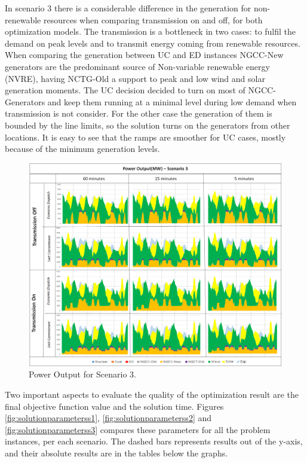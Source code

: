 \documentclass[12pt,LUDisStyle,twosided]{book}
\begin{document}
In scenario 3 there is a considerable difference in the generation for non-renewable resources when comparing transmission on and off, for both optimization models. The transmission is a bottleneck in two cases: to fulfil the demand on peak levels and to transmit energy coming from renewable resources. When comparing the generation between UC and ED instances NGCC-New generators are the predominant source of Non-variable renewable energy (NVRE), having NCTG-Old a support to peak and low wind and solar generation moments. The UC decision decided to turn on most of NGCC-Generators and keep them running at a minimal level during low demand when transmission is not consider. For the other case the generation of them is bounded by the line limits, so the solution turns on the generators from other locations. It is easy to see that the ramps are smoother for UC cases, mostly because of the minimum generation levels.

\begin{figure} 
  \centering
  
	  \includegraphics[width=\textwidth,height=\textheight,keepaspectratio]{PowerOutputScenario3.png}
  
  \caption{Power Output for Scenario 3.}
  \label{fig:powerOutputScenario3}
\end{figure}


Two important aspects to evaluate the quality of the optimization result are the final objective function value and the solution time. Figures \ref{fig:solutionparameterss1}, \ref{fig:solutionparameterss2} and \ref{fig:solutionparameterss3} compares these parameters for all the problem instances, per each scenario. The dashed bars represents results out of the y-axis, and their absolute results are in the tables below the graphs. 
\end{document}
